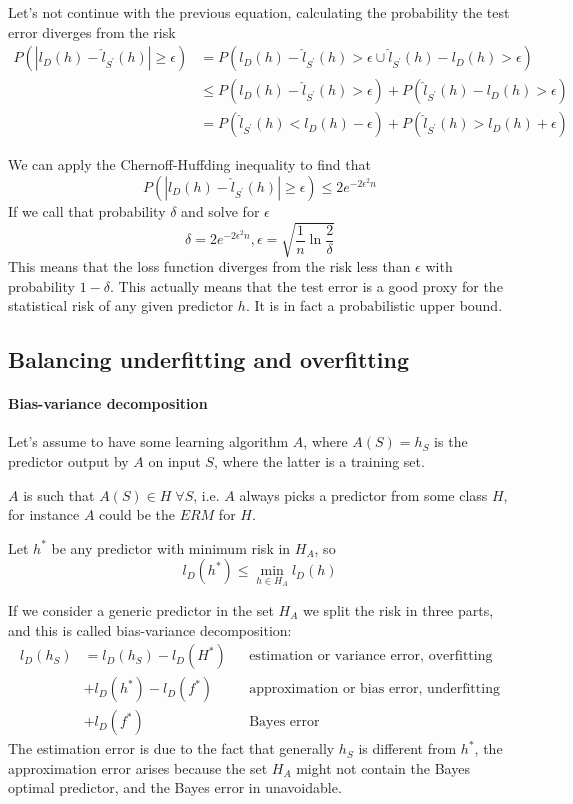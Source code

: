 Let's not continue with the previous equation, calculating the probability the 
test error diverges from the risk
\begin{equation}
    \begin{aligned}
        P(|l_D(h) - \hat{l}_{S^\prime}(h)| \geq \epsilon) 
        &= P(l_D(h) - \hat{l}_{S^\prime}(h) > \epsilon \cup
        \hat{l}_{S^\prime}(h) - l_D(h) > \epsilon)\\
        &\leq P(l_D(h) - \hat{l}_{S^\prime}(h) > \epsilon) +
        P(\hat{l}_{S^\prime}(h) - l_D(h) > \epsilon)\\
        &= P(\hat{l}_{S^\prime}(h) < l_D(h) - \epsilon) +
        P(\hat{l}_{S^\prime}(h) > l_D(h) + \epsilon)
    \end{aligned}
\end{equation}

We can apply the Chernoff-Huffding inequality to find that
 $$P(|l_D(h) - \hat{l}_{S^\prime}(h)| \geq \epsilon) \leq 2e^{-2\epsilon^2n}$$
If we call that probability $\delta$ and solve for $\epsilon$
$$\delta = 2e^{-2\epsilon^2n}, \epsilon = \sqrt{\frac{1}{n}\ln \frac{2}{\delta}}$$
This means that the loss function diverges from the risk less than $\epsilon$ with probability
$1-\delta$.
This actually means that the test error is a good proxy
for the statistical risk of any given predictor $h$. It is in fact a 
probabilistic upper bound.

\subsection{Balancing underfitting and overfitting}

\paragraph{Bias-variance decomposition}
Let's assume to have some learning algorithm $A$, where
$A(S) = h_S$ is the predictor output by $A$ on input $S$, where the latter 
is a training set.

$A$ is such that $A(S) \in H\;\forall S$, i.e. $A$ always picks a predictor 
from some class $H$, for instance $A$ could be the $\mathit{ERM}$ for $H$.

Let $h^*$ be any predictor with minimum risk in $H_A$, so 
$$l_D(h^*) \leq \min_{h \in H_A} l_D(h)$$

If we consider a generic predictor in the set $H_A$ we split the risk 
in three parts, and this is called bias-variance decomposition:
\begin{equation}
    \begin{aligned}
        l_D(h_S) &= l_D(h_S) - l_D(H^*) && \text{estimation or variance error, overfitting}\\
        &+ l_D(h^*) - l_D(f^*) && \text{approximation or bias error, underfitting}\\
        &+ l_D(f^*) && \text{Bayes error}
    \end{aligned}
\end{equation}
The estimation error is due to the fact that generally $h_S$ is different from 
$h^*$, the approximation error arises because the set $H_A$ might not contain
the Bayes optimal predictor, and the Bayes error in unavoidable.

